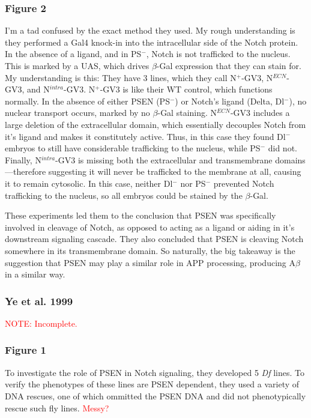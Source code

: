 \documentclass[12pt]{report}
\newcommand{\be}{\beta}
\begin{document}
\subsubsection*{Figure 2} I'm a tad confused by the exact method they used. My rough understanding is they performed a Gal4 knock-in into the intracellular side of the Notch protein. In the absence of a ligand, and in PS$^-$, Notch is not trafficked to the nucleus. This is marked by a UAS, which drives $\beta$-Gal expression that they can stain for. My understanding is this: They have 3 lines, which they call N$^+$-GV3, N$^{ECN}$-GV3, and N$^{intra}$-GV3. N$^+$-GV3 is like their WT control, which functions normally. In the absence of either PSEN (PS$^-$) or Notch's ligand (Delta, Dl$^-$), no nuclear transport occurs, marked by no $\beta$-Gal staining. N$^{ECN}$-GV3 includes a large deletion of the extracellular domain, which essentially decouples Notch from it's ligand and makes it constitutely active. Thus, in this case they found Dl$^-$ embryos to still have considerable trafficking to the nucleus, while PS$^-$ did not. Finally, N$^{intra}$-GV3 is missing both the extracellular and transmembrane domains---therefore suggesting it will never be trafficked to the membrane at all, causing it to remain cytosolic. In this case, neither Dl$^-$ nor PS$^-$ prevented Notch trafficking to the nucleus, so all embryos could be stained by the $\be$-Gal.\newline

These experiments led them to the conclusion that PSEN was specifically involved in cleavage of Notch, as opposed to acting as a ligand or aiding in it's downstream signaling cascade. They also concluded that PSEN is cleaving Notch somewhere in its transmembrane domain. So naturally, the big takeaway is the suggestion that PSEN may play a similar role in APP processing, producing A$\be$ in a similar way. 

\subsubsection{Ye et al. 1999} 

\textcolor{red}{NOTE: Incomplete.}

\subsubsection{Figure 1} To investigate the role of PSEN in Notch signaling, they developed 5 \textit{Df} lines. To verify the phenotypes of these lines are PSEN dependent, they used a variety of DNA rescues, one of which ommitted the PSEN DNA and did not phenotypically rescue such fly lines. \textcolor{red}{Messy?}
\end{document}
